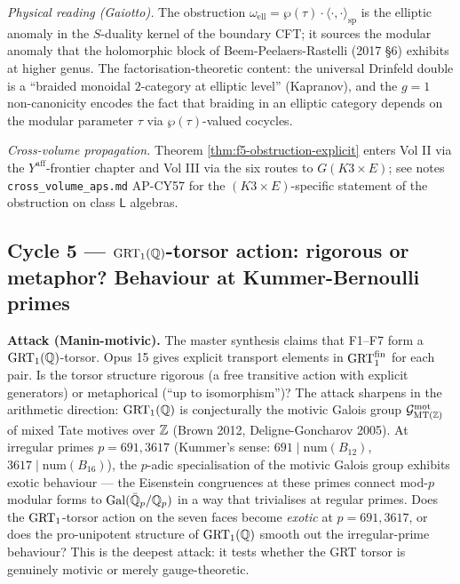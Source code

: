 \emph{Physical reading (Gaiotto).}
The obstruction $\omega_{\mathrm{ell}} = \wp(\tau) \cdot \langle\cdot,\cdot\rangle_{\mathrm{sp}}$
is the elliptic anomaly in the $S$-duality kernel of the boundary CFT;
it sources the modular anomaly that the holomorphic block of
Beem-Peelaers-Rastelli (2017 \S6) exhibits at higher genus. The
factorisation-theoretic content: the universal Drinfeld double is a
``braided monoidal $2$-category at elliptic level'' (Kapranov), and
the $g = 1$ non-canonicity encodes the fact that braiding in an
elliptic category depends on the modular parameter $\tau$ via
$\wp(\tau)$-valued cocycles.

\emph{Cross-volume propagation.}
Theorem \ref{thm:f5-obstruction-explicit} enters Vol II via the
$Y^{\mathrm{aff}}$-frontier chapter and Vol III via the six routes
to $G(K3 \times E)$; see notes \texttt{cross\_volume\_aps.md} AP-CY57
for the $(K3 \times E)$-specific statement of the obstruction on
class $\mathsf{L}$ algebras.

\subsection*{Cycle 5 --- $\mathrm{GRT}_1(\mathbb{Q})$-torsor action: rigorous or metaphor? Behaviour at Kummer-Bernoulli primes}

\textbf{Attack (Manin-motivic).}
The master synthesis claims that F1--F7 form a $\mathrm{GRT}_1(\mathbb{Q})$-torsor.
Opus 15 gives explicit transport elements in $\mathrm{GRT}_1^{\mathrm{fin}}$ for each pair.
Is the torsor structure rigorous (a free transitive action with
explicit generators) or metaphorical (``up to isomorphism'')? The
attack sharpens in the arithmetic direction: $\mathrm{GRT}_1(\mathbb{Q})$ is conjecturally
the motivic Galois group $\mathcal{G}^{\mathrm{mot}}_{\mathrm{MT}(\mathbb{Z})}$ of mixed Tate motives over
$\mathbb{Z}$ (Brown 2012, Deligne-Goncharov 2005). At irregular primes
$p = 691, 3617$ (Kummer's sense: $691 \mid \mathrm{num}(B_{12})$,
$3617 \mid \mathrm{num}(B_{16})$), the $p$-adic specialisation of the
motivic Galois group exhibits exotic behaviour --- the Eisenstein
congruences at these primes connect mod-$p$ modular forms to
$\mathrm{Gal}(\bar{\mathbb{Q}}_p/\mathbb{Q}_p)$ in a way that trivialises at regular
primes. Does the $\mathrm{GRT}_1$-torsor action on the seven faces become
\emph{exotic} at $p = 691, 3617$, or does the pro-unipotent structure
of $\mathrm{GRT}_1(\mathbb{Q})$ smooth out the irregular-prime behaviour? This is the
deepest attack: it tests whether the GRT torsor is genuinely motivic
or merely gauge-theoretic.

